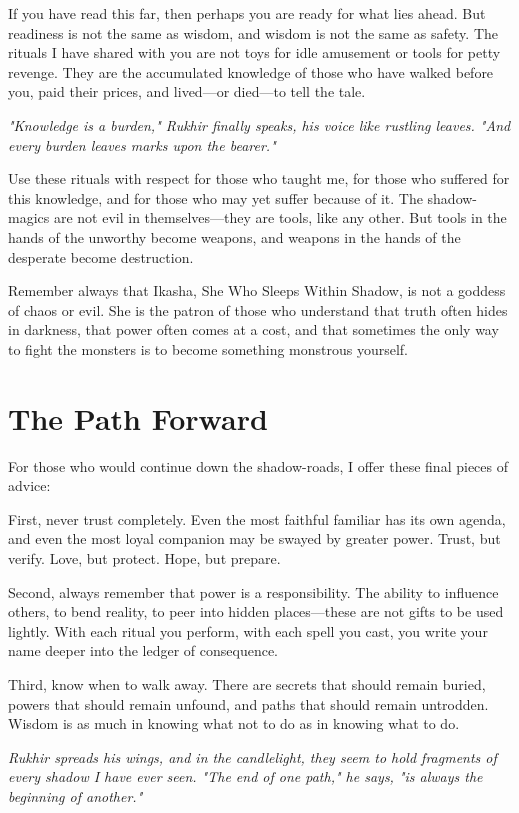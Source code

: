 \documentclass[12pt,twoside]{book}
\newcommand{\shadow}[1]{\textit{#1}}
\begin{document}
If you have read this far, then perhaps you are ready for what lies ahead. But readiness is not the same as wisdom, and wisdom is not the same as safety. The rituals I have shared with you are not toys for idle amusement or tools for petty revenge. They are the accumulated knowledge of those who have walked before you, paid their prices, and lived—or died—to tell the tale.

\shadow{"Knowledge is a burden," Rukhir finally speaks, his voice like rustling leaves. "And every burden leaves marks upon the bearer."}

Use these rituals with respect for those who taught me, for those who suffered for this knowledge, and for those who may yet suffer because of it. The shadow-magics are not evil in themselves—they are tools, like any other. But tools in the hands of the unworthy become weapons, and weapons in the hands of the desperate become destruction.

Remember always that Ikasha, She Who Sleeps Within Shadow, is not a goddess of chaos or evil. She is the patron of those who understand that truth often hides in darkness, that power often comes at a cost, and that sometimes the only way to fight the monsters is to become something monstrous yourself.

\section*{The Path Forward}

For those who would continue down the shadow-roads, I offer these final pieces of advice:

First, never trust completely. Even the most faithful familiar has its own agenda, and even the most loyal companion may be swayed by greater power. Trust, but verify. Love, but protect. Hope, but prepare.

Second, always remember that power is a responsibility. The ability to influence others, to bend reality, to peer into hidden places—these are not gifts to be used lightly. With each ritual you perform, with each spell you cast, you write your name deeper into the ledger of consequence.

Third, know when to walk away. There are secrets that should remain buried, powers that should remain unfound, and paths that should remain untrodden. Wisdom is as much in knowing what not to do as in knowing what to do.

\shadow{Rukhir spreads his wings, and in the candlelight, they seem to hold fragments of every shadow I have ever seen. "The end of one path," he says, "is always the beginning of another."}
\end{document}
